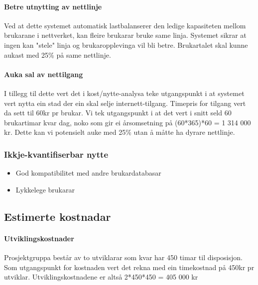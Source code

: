 \documentclass[nynorsk,12pt,a4paper]{article}
\begin{document}
\paragraph{Betre utnytting av nettlinje}
Ved at dette systemet automatisk lastbalanserer den ledige kapasiteten mellom brukarane i nettverket, kan fleire brukarar bruke same linja. Systemet sikrar at ingen kan "stele" linja og brukaropplevinga vil bli betre. Brukartalet skal kunne aukast med 25\% på same nettlinje.
\paragraph{Auka sal av nettilgang}
I tillegg til dette vert det i kost/nytte-analysa teke utgangspunkt i at systemet vert nytta ein stad der ein skal selje internett-tilgang. Timepris for tilgang vert da sett til 60kr pr brukar. Vi tek utgangspunkt i at det vert  i snitt seld 60 brukartimar kvar dag, noko som gir ei årsomsetning på (60*365)*60 = 1 314 000 kr. Dette kan vi potensielt auke med 25\% utan å måtte ha dyrare nettlinje. 

\subsubsection{Ikkje-kvantifiserbar nytte}
\begin{itemize}
	\item God kompatibilitet med andre brukardatabasar
	\item Lykkelege brukarar
\end{itemize}
\subsection{Estimerte kostnadar}
\paragraph{Utviklingskostnader}
Prosjektgruppa består av to utviklarar som kvar har 450 timar til disposisjon. Som utgangspunkt for kostnaden vert det rekna med ein timekostnad på 450kr pr utviklar. Utviklingskostnadene er altså 2*450*450 = 405 000 kr
\end{document}
